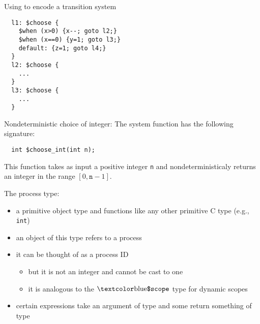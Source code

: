 \documentclass[t]{beamer}
\begin{document}
\begin{frame}[containsverbatim]{Using \cchoose{} to encode a
    transition system}
\begin{verbatim}
  l1: $choose {
    $when (x>0) {x--; goto l2;}
    $when (x==0) {y=1; goto l3;}
    default: {z=1; goto l4;}
  }
  l2: $choose {
    ...
  }
  l3: $choose {
    ...
  }
\end{verbatim}
\end{frame}


\begin{frame}[containsverbatim]{Nondeterministic choice of integer: \cchooseint}
  The system function \cchooseint{} has the following signature:

\begin{verbatim}
  int $choose_int(int n);
\end{verbatim}

  This function takes as input a positive integer \texttt{n} and
  nondeterministicaly returns an integer in the range
  $[0,\texttt{n}-1]$.
\end{frame}

\begin{frame}{The process type: \cproc}
  \begin{itemize}
  \item a primitive object type and functions like any other primitive
    C type (e.g., \texttt{int})
  \item an object of this type refers to a
    process
  \item it can be thought of as a process ID
    \begin{itemize}
    \item but it is not an integer and cannot be cast to one
    \item it is analogous to the $\cscope$ type for dynamic scopes
    \end{itemize}
  \item certain expressions take an argument of \cproc{} type and some return
    something of \cproc{} type
  \end{itemize}
\end{frame}
\end{document}
